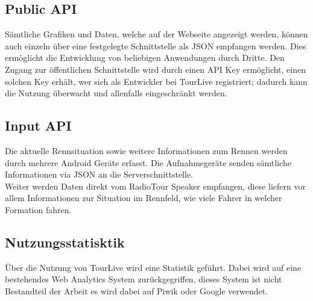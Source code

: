 \subsection{Public API}
Sämtliche Grafiken und Daten, welche auf der Webseite angezeigt werden, können auch einzeln über eine festgelegte Schnittstelle als JSON empfangen werden. Dies ermöglicht die Entwicklung von beliebigen Anwendungen durch Dritte. Den Zugang zur öffentlichen Schnittstelle wird durch einen API Key ermöglicht, einen solchen Key erhält, wer sich als Entwickler bei TourLive registriert; dadurch kann die Nutzung überwacht und allenfalls eingeschränkt werden.
\subsection{Input API}
Die aktuelle Rennsituation sowie weitere Informationen zum Rennen werden durch mehrere Android Geräte erfasst. Die Aufnahmegeräte senden sämtliche Informationen via JSON an die Serverschnittstelle. 
\\
Weiter werden Daten direkt vom RadioTour Speaker empfangen, diese liefern vor allem Informationen zur Situation im Rennfeld, wie viele Fahrer in welcher Formation fahren.
\subsection{Nutzungsstatisktik}
Über die Nutzung von TourLive wird eine Statistik geführt. Dabei wird auf eine bestehendes Web Analytics System zurückgegriffen, dieses System ist nicht Bestandteil der Arbeit es wird dabei auf Piwik oder Google verwendet.